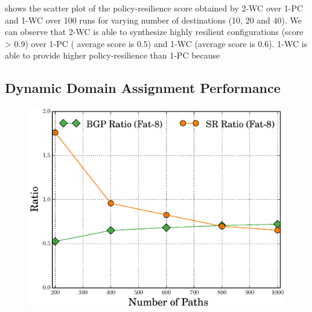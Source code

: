  shows the scatter plot of the policy-resilience 
score obtained by 2-WC over 1-PC and 1-WC over 100 runs
for varying number of destinations (10, 20 and 40). 
We can observe that 2-WC is able to synthesize highly
resilient configurations (score > 0.9) over 1-PC (
average score is 0.5) and 1-WC (average score is 0.6). 
1-WC is able to provide higher policy-resilience than
1-PC because

\begin{figure}
	\centering
\end{figure}
%	


\subsection{Dynamic Domain Assignment Performance} \label{sec:mcmceval}
\begin{figure}
	\includegraphics[width=0.33\columnwidth]{figures/ratioMCMC.eps}
\end{figure}

